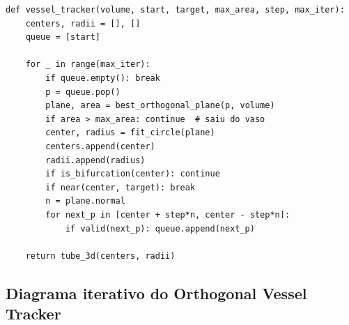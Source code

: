 \documentclass[12pt,a4paper]{article}
\begin{document}
\begin{algorithm}[H]
\caption{Orthogonal Vessel Tracker — rastreamento por cortes transversais}
\begin{lstlisting}[style=pseudopy]
def vessel_tracker(volume, start, target, max_area, step, max_iter):
    centers, radii = [], []
    queue = [start]

    for _ in range(max_iter):
        if queue.empty(): break
        p = queue.pop()
        plane, area = best_orthogonal_plane(p, volume)
        if area > max_area: continue  # saiu do vaso
        center, radius = fit_circle(plane)
        centers.append(center)
        radii.append(radius)
        if is_bifurcation(center): continue
        if near(center, target): break
        n = plane.normal
        for next_p in [center + step*n, center - step*n]:
            if valid(next_p): queue.append(next_p)

    return tube_3d(centers, radii)
\end{lstlisting}
\end{algorithm}

\subsection{Diagrama iterativo do Orthogonal Vessel Tracker}
\end{document}
